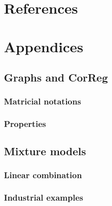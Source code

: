 \documentclass[11pt,a4paper]{report}
\begin{document}
\chapter{References}
{ }

\chapter{Appendices}
	\section{Graphs and CorReg}
		\subsection{Matricial notations}
		\subsection{Properties}
	\section{Mixture models}
		\subsection{Linear combination}
			
		\subsection{Industrial examples}	
\end{document}
